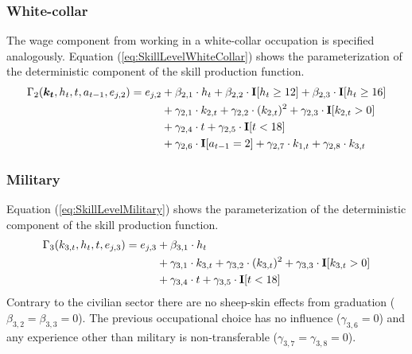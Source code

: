 \subsubsection*{White-collar}
The wage component from working in a white-collar occupation is specified analogously. Equation (\ref{eq:SkillLevelWhiteCollar}) shows the parameterization of the deterministic component of the skill production function.
%
\begin{align}\label{eq:SkillLevelWhiteCollar}
    \Gamma_2(\bm{k_t}, h_t, t, a_{t-1}, e_{j,2}) = e_{j,2} & + \beta_{2,1} \cdot h_t + \beta_{2, 2} \cdot {\textbf{I}}[h_t \geq 12] + \beta_{2,3} \cdot {\textbf{I}}[h_t\geq 16] \\\nonumber
    							 & + \gamma_{2, 1} \cdot  k_{2,t} + \gamma_{2,2} \cdot  (k_{2,t})^2 + \gamma_{2,3} \cdot  {\textbf{I}}[k_{2,t} > 0] \\\nonumber
                                   & + \gamma_{2,4} \cdot  t + \gamma_{2,5} \cdot {\textbf{I}}[t < 18] \\\nonumber
                                  & + \gamma_{2,6} \cdot  {\textbf{I}}[a_{t-1} = 2]  + \gamma_{2,7} \cdot  k_{1,t} + \gamma_{2,8} \cdot  k_{3,t}
\end{align}
\subsubsection*{Military}
Equation (\ref{eq:SkillLevelMilitary}) shows the parameterization of the deterministic component of the skill production function.
%
\begin{align}\label{eq:SkillLevelMilitary}
    \Gamma_3( k_{3,t}, h_t, t, e_{j,3}) = e_{j,3} & + \beta_{3,1} \cdot h_t \\\nonumber
	               \nonumber &+ \gamma_{3,1} \cdot  k_{3,t} + \gamma_{3,2} \cdot (k_{3,t})^2 + \gamma_{3,3} \cdot {\textbf{I}}[k_{3,t} > 0]\\\nonumber
									 & + \gamma_{3,4} \cdot t + \gamma_{3,5} \cdot {\textbf{I}}[t < 18]
\end{align}
%
Contrary to the civilian sector there are no sheep-skin effects from graduation ($\beta_{3,2} = \beta_{3,3}= 0$). The previous occupational choice has no influence ($\gamma_{3,6}= 0$) and any experience other than military is non-transferable ($\gamma_{3,7} = \gamma_{3,8} = 0$).

